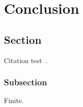 \chapter{Conclusion}\label{chapter:conclusion}

\section{Section}
Citation test~\parencite{Paulson1989}.

\subsection{Subsection}

Finite.